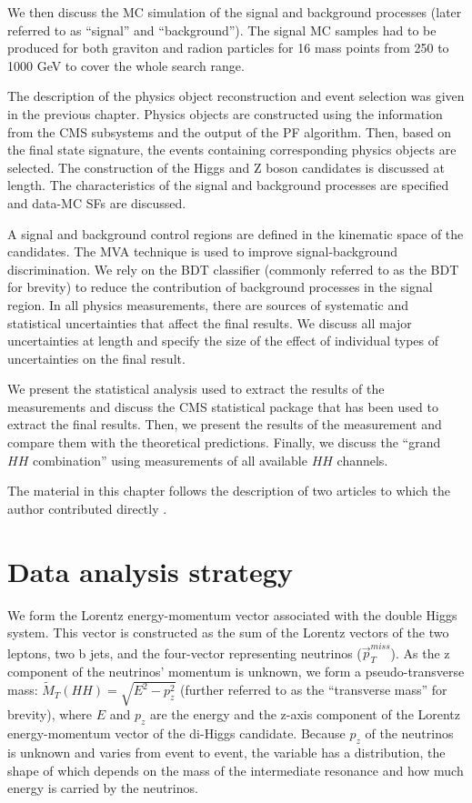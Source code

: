 We then discuss the MC simulation of the signal and background processes (later referred to as ``signal'' and ``background''). The signal MC samples had to be produced for both graviton and radion particles for 16 mass points from 250 to 1000 GeV to cover the whole search range. 

The description of the physics object reconstruction and event selection was given in the previous chapter. Physics objects are constructed using the information from the CMS subsystems and the output of the PF algorithm. Then, based on the final state signature, the events containing corresponding physics objects are selected. The construction of the Higgs and Z boson candidates is discussed at length. The characteristics of the signal and background processes are specified and data-MC SFs are discussed.

A signal and background control regions are defined in the kinematic space of the candidates. The MVA technique is used to improve signal-background discrimination. We rely on the BDT classifier (commonly referred to as the BDT for brevity) to reduce the contribution of background processes in the signal region. In all physics measurements, there are sources of systematic and statistical uncertainties that affect the final results. We discuss all major uncertainties at length and specify the size of the effect of individual types of uncertainties on the final result. 

We present the statistical analysis used to extract the results of the measurements and discuss the CMS statistical package that has been used to extract the final results. Then, we present the results of the measurement and compare them with the theoretical predictions. Finally, we discuss the ``grand $HH$ combination'' using measurements of all available $HH$ channels.

The material in this chapter follows the description of two articles to which the author contributed directly \cite{bbZZAN, CMS-PAS-HIG-17-032}.

\section{Data analysis strategy}
\label{sec:strategy}
We form the Lorentz energy-momentum vector associated with the double Higgs system. This vector is constructed as the sum of the Lorentz vectors of the two leptons, two b jets, and the four-vector representing neutrinos ($\vec{p}^{miss}_T$). As the z component of the neutrinos' momentum is unknown, we form a pseudo-transverse mass:
$\tilde{M}_T(HH) = \sqrt{E^2 - p_{z}^2}$ (further referred to as the ``transverse mass'' for brevity), where $E$ and $p_z$ are the energy and the z-axis component of the Lorentz energy-momentum vector of the di-Higgs candidate. Because $p_z$ of the neutrinos is unknown and varies from event to event, the variable \mTHH has a distribution, the shape of which depends on the mass of the intermediate resonance and how much energy is carried by the neutrinos.

